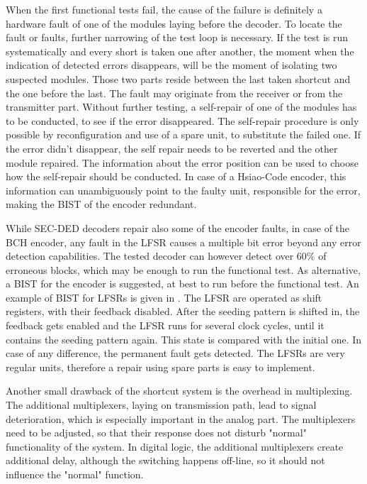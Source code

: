 When the first functional tests fail, the cause of the failure is definitely a hardware fault of one of the modules laying before the decoder. To locate the fault or faults, further narrowing of the test loop is necessary. If the test is run systematically and every short is taken one after another, the moment when the indication of detected errors disappears, will be the moment of isolating two suspected modules. Those two parts reside between the last taken shortcut and the one before the last. The fault may originate from the receiver or from the transmitter part. Without further testing, a self-repair of one of the modules has to be conducted, to see if the error disappeared. The self-repair procedure is only possible by reconfiguration and use of a spare unit, to substitute the failed one. If the error didn't disappear, the self repair needs to be reverted and the other module repaired. The information about the error position can be used to choose how the self-repair should be conducted. In case of a Hsiao-Code encoder, this information can unambiguously point to the faulty unit, responsible for the error, making the BIST of the encoder redundant.

While SEC-DED decoders repair also some of the encoder faults, in case of the BCH encoder, any fault in the LFSR causes a multiple bit error beyond any error detection capabilities. The tested decoder can however detect over 60\% of erroneous blocks, which may be enough to run the functional test. As alternative, a BIST for the encoder is suggested, at best to run before the functional test. An example of BIST for LFSRs is given in \cite{art:Gleichner}. The LFSR are operated as shift registers, with their feedback disabled. After the seeding pattern is shifted in, the feedback gets enabled and the LFSR runs for several clock cycles, until it contains the seeding pattern again. This state is compared with the initial one. In case of any difference, the permanent fault gets detected. The LFSRs are very regular units, therefore a repair using spare parts is easy to implement.

Another small drawback of the shortcut system is the overhead in multiplexing. The additional multiplexers, laying on transmission path, lead to signal deterioration, which is especially important in the analog part. The multiplexers need to be adjusted, so that their response does not disturb "normal" functionality of the system. In digital logic, the additional multiplexers create additional delay, although the switching happens off-line, so it should not influence the "normal" function.


